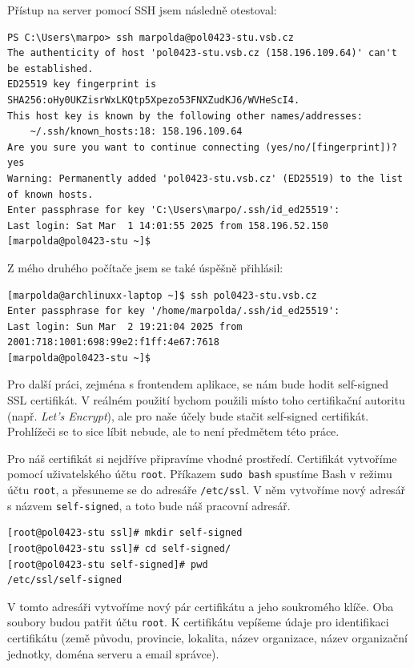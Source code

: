 Přístup na server pomocí SSH jsem následně otestoval:
\begin{verbatim}
PS C:\Users\marpo> ssh marpolda@pol0423-stu.vsb.cz
The authenticity of host 'pol0423-stu.vsb.cz (158.196.109.64)' can't be established.
ED25519 key fingerprint is SHA256:oHy0UKZisrWxLKQtp5Xpezo53FNXZudKJ6/WVHeScI4.
This host key is known by the following other names/addresses:
    ~/.ssh/known_hosts:18: 158.196.109.64
Are you sure you want to continue connecting (yes/no/[fingerprint])? yes
Warning: Permanently added 'pol0423-stu.vsb.cz' (ED25519) to the list of known hosts.
Enter passphrase for key 'C:\Users\marpo/.ssh/id_ed25519':
Last login: Sat Mar  1 14:01:55 2025 from 158.196.52.150
[marpolda@pol0423-stu ~]$
\end{verbatim}

Z mého druhého počítače jsem se také úspěšně přihlásil:
\begin{verbatim}
[marpolda@archlinuxx-laptop ~]$ ssh pol0423-stu.vsb.cz
Enter passphrase for key '/home/marpolda/.ssh/id_ed25519':
Last login: Sun Mar  2 19:21:04 2025 from 2001:718:1001:698:99e2:f1ff:4e67:7618
[marpolda@pol0423-stu ~]$
\end{verbatim}

Pro další práci, zejména s frontendem aplikace, se nám
bude hodit self-signed SSL certifikát. V reálném použití
bychom použili místo toho certifikační autoritu (např.
\emph{Let's Encrypt}), ale pro naše účely bude stačit
self-signed certifikát. Prohlížeči se to sice líbit
nebude, ale to není předmětem této práce.

Pro náš certifikát si nejdříve připravíme vhodné prostředí.
Certifikát vytvoříme pomocí uživatelského účtu \texttt{root}.
Příkazem \texttt{sudo bash} spustíme Bash v režimu účtu
\texttt{root}, a přesuneme se do adresáře \texttt{/etc/ssl}.
V něm vytvoříme nový adresář s názvem \texttt{self-signed},
a toto bude náš pracovní adresář.

\begin{verbatim}
[root@pol0423-stu ssl]# mkdir self-signed
[root@pol0423-stu ssl]# cd self-signed/
[root@pol0423-stu self-signed]# pwd
/etc/ssl/self-signed
\end{verbatim}

V tomto adresáři vytvoříme nový pár certifikátu a jeho
soukromého klíče. Oba soubory budou patřit účtu \texttt{root}.
K certifikátu vepíšeme údaje pro identifikaci certifikátu
(země původu, provincie, lokalita, název organizace, název
organizační jednotky, doména serveru a email správce).

